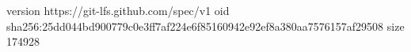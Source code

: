 version https://git-lfs.github.com/spec/v1
oid sha256:25dd044bd900779c0e3ff7af224e6f85160942e92ef8a380aa7576157af29508
size 174928
